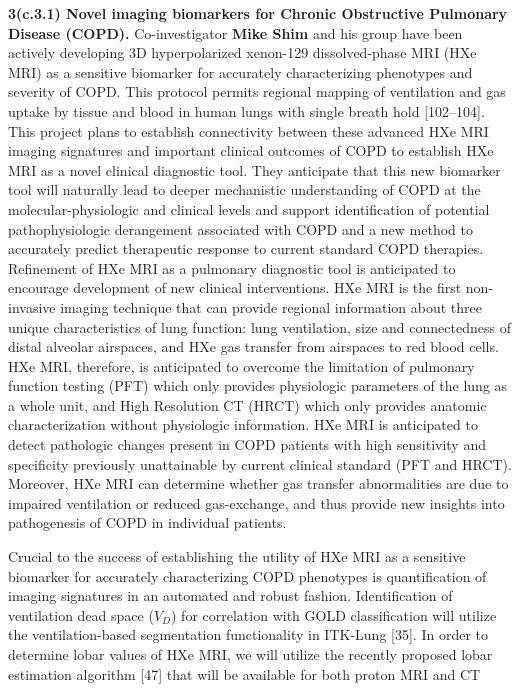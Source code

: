\documentclass[11pt,]{article}
\begin{document}
\textbf{3(c.3.1) Novel imaging biomarkers for Chronic Obstructive
Pulmonary Disease (COPD).} Co-investigator \textbf{Mike Shim} and his
group have been actively developing 3D hyperpolarized xenon-129
dissolved-phase MRI (HXe MRI) as a sensitive biomarker for accurately
characterizing phenotypes and severity of COPD. This protocol permits
regional mapping of ventilation and gas uptake by tissue and blood in
human lungs with single breath hold {[}102--104{]}. This project plans
to establish connectivity between these advanced HXe MRI imaging
signatures and important clinical outcomes of COPD to establish HXe MRI
as a novel clinical diagnostic tool. They anticipate that this new
biomarker tool will naturally lead to deeper mechanistic understanding
of COPD at the molecular-physiologic and clinical levels and support
identification of potential pathophysiologic derangement associated with
COPD and a new method to accurately predict therapeutic response to
current standard COPD therapies. Refinement of HXe MRI as a pulmonary
diagnostic tool is anticipated to encourage development of new clinical
interventions. HXe MRI is the first non-invasive imaging technique that
can provide regional information about three unique characteristics of
lung function: lung ventilation, size and connectedness of distal
alveolar airspaces, and HXe gas transfer from airspaces to red blood
cells. HXe MRI, therefore, is anticipated to overcome the limitation of
pulmonary function testing (PFT) which only provides physiologic
parameters of the lung as a whole unit, and High Resolution CT (HRCT)
which only provides anatomic characterization without physiologic
information. HXe MRI is anticipated to detect pathologic changes present
in COPD patients with high sensitivity and specificity previously
unattainable by current clinical standard (PFT and HRCT). Moreover, HXe
MRI can determine whether gas transfer abnormalities are due to impaired
ventilation or reduced gas-exchange, and thus provide new insights into
pathogenesis of COPD in individual patients.

Crucial to the success of establishing the utility of HXe MRI as a
sensitive biomarker for accurately characterizing COPD phenotypes is
quantification of imaging signatures in an automated and robust fashion.
Identification of ventilation dead space ($V_D$) for correlation with
GOLD classification will utilize the ventilation-based segmentation
functionality in ITK-Lung {[}35{]}. In order to determine lobar values
of HXe MRI, we will utilize the recently proposed lobar estimation
algorithm {[}47{]} that will be available for both proton MRI and CT
\end{document}
